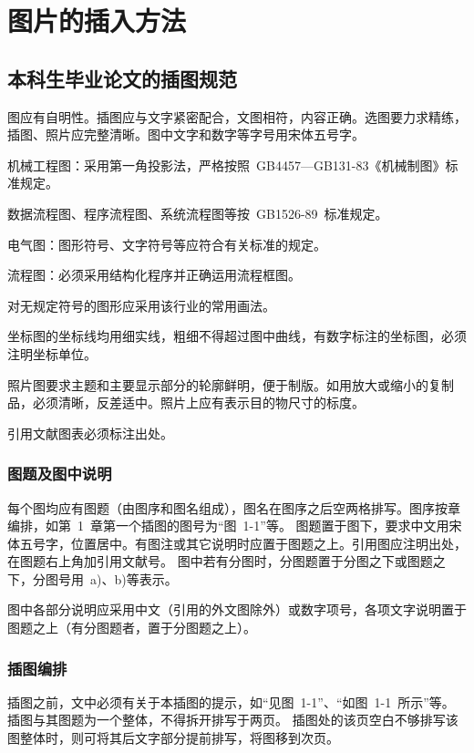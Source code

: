 
\chapter{图片的插入方法}

\section{本科生毕业论文的插图规范}

图应有自明性。插图应与文字紧密配合，文图相符，内容正确。选图要力求精练，插图、照片应完整清晰。图中文字和数字等字号用宋体五号字。

机械工程图：采用第一角投影法，严格按照~GB4457---GB131-83《机械制图》标准规定。

数据流程图、程序流程图、系统流程图等按~GB1526-89~标准规定。

电气图：图形符号、文字符号等应符合有关标准的规定。

流程图：必须采用结构化程序并正确运用流程框图。

对无规定符号的图形应采用该行业的常用画法。

坐标图的坐标线均用细实线，粗细不得超过图中曲线，有数字标注的坐标图，必须注明坐标单位。

照片图要求主题和主要显示部分的轮廓鲜明，便于制版。如用放大或缩小的复制品，必须清晰，反差适中。照片上应有表示目的物尺寸的标度。

引用文献图表必须标注出处。


\subsection{图题及图中说明}
每个图均应有图题（由图序和图名组成），图名在图序之后空两格排写。图序按章编排，如第~1~章第一个插图的图号为“图~1-1”等。
图题置于图下，要求中文用宋体五号字，位置居中。有图注或其它说明时应置于图题之上。引用图应注明出处，在图题右上角加引用文献号。
图中若有分图时，分图题置于分图之下或图题之下，分图号用~a)、b)等表示。

图中各部分说明应采用中文（引用的外文图除外）或数字项号，各项文字说明置于图题之上（有分图题者，置于分图题之上）。

\subsection{插图编排}
插图之前，文中必须有关于本插图的提示，如“见图~1-1”、“如图~1-1~所示”等。插图与其图题为一个整体，不得拆开排写于两页。
插图处的该页空白不够排写该图整体时，则可将其后文字部分提前排写，将图移到次页。

